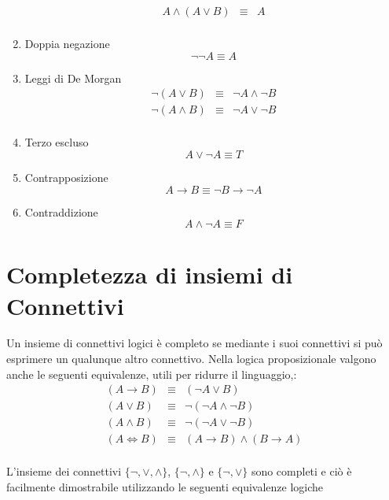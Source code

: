 \begin{enumerate}
\begin{align*}
                A \land (A \lor B) & \equiv & A \\
            \end{align*}
    \item Doppia negazione
                \begin{equation}
                    \neg \neg A \equiv A
                \end{equation}
    \item Leggi di De Morgan
            \begin{align*}
                \neg (A \lor B) & \equiv & \neg A \land \neg B \\
                \neg(A \land B) & \equiv & \neg A \lor \neg B \\
            \end{align*}
    \item Terzo escluso
            \begin{equation}
                A \lor \neg A \equiv T
            \end{equation}
    \item Contrapposizione
            \begin{equation}
                A \rightarrow B \equiv \neg B \rightarrow \neg A
            \end{equation}
    \item Contraddizione
            \begin{equation}
                A \land \neg A \equiv F
            \end{equation}
\end{enumerate}

\section{Completezza di insiemi di Connettivi}
Un insieme di connettivi logici è completo se mediante i suoi connettivi si può
esprimere un qualunque altro connettivo.
Nella logica proposizionale valgono anche le seguenti equivalenze, utili per ridurre il linguaggio,:
\begin{align*}
    (A \rightarrow B) & \equiv & (\neg A \lor B) \\
    (A \lor B) & \equiv & \neg(\neg A \land \neg B) \\
    (A \land B) & \equiv & \neg(\neg A \lor \neg B) \\
    (A \iff B) & \equiv & (A \rightarrow B) \land (B \rightarrow A) \\
\end{align*}

L'insieme dei connettivi $\{ \neg,\lor,\land \}$, $\{ \neg,\land \}$ e $\{ \neg,\lor \}$ sono completi
e ciò è facilmente dimostrabile utilizzando le seguenti equivalenze logiche
